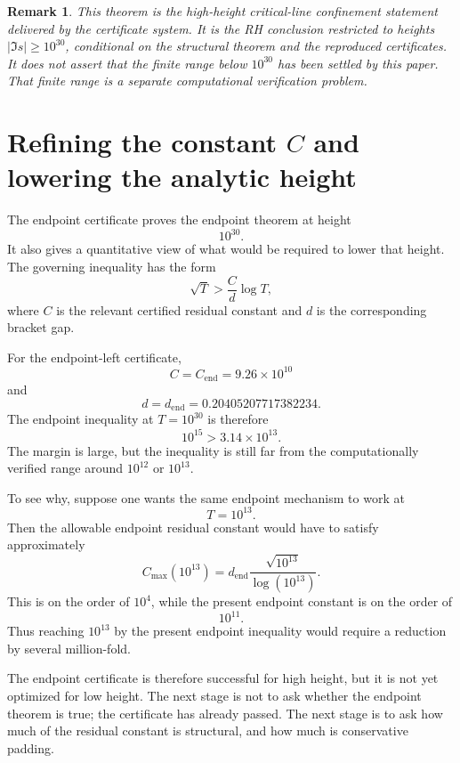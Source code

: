 \documentclass[11pt]{article}
\newtheorem{remark}[theorem]{Remark}
\newcommand{\Cend}{C_{\mathrm{end}}}
\newcommand{\dend}{d_{\mathrm{end}}}
\begin{document}
\begin{remark}
This theorem is the high-height critical-line confinement statement delivered
by the certificate system.  It is the RH conclusion restricted to heights
\(|\Im s|\ge10^{30}\), conditional on the structural theorem and the reproduced
certificates.  It does not assert that the finite range below \(10^{30}\) has been settled by this paper.  That finite range is a separate computational verification problem.
\end{remark}







\appendix

\section{Refining the constant \(C\) and lowering the analytic height}

The endpoint certificate proves the endpoint theorem at height
\[
10^{30}.
\]
It also gives a quantitative view of what would be required to lower that height.  The governing inequality has the form
\[
\sqrt{T}>
\frac{C}{d}\log T,
\]
where \(C\) is the relevant certified residual constant and \(d\) is the corresponding bracket gap.

For the endpoint-left certificate,
\[
C=\Cend
=
9.26\times10^{10}
\]
and
\[
d=\dend=0.20405207717382234.
\]
The endpoint inequality at \(T=10^{30}\) is therefore
\[
10^{15}
>
3.14\times10^{13}.
\]
The margin is large, but the inequality is still far from the computationally verified range around \(10^{12}\) or \(10^{13}\).

To see why, suppose one wants the same endpoint mechanism to work at
\[
T=10^{13}.
\]
Then the allowable endpoint residual constant would have to satisfy approximately
\[
C_{\max}(10^{13})
=
\dend\frac{\sqrt{10^{13}}}{\log(10^{13})}.
\]
This is on the order of \(10^4\), while the present endpoint constant is on the order of
\[
10^{11}.
\]
Thus reaching \(10^{13}\) by the present endpoint inequality would require a reduction by several million-fold.

The endpoint certificate is therefore successful for high height, but it is not yet optimized for low height.  The next stage is not to ask whether the endpoint theorem is true; the certificate has already passed.  The next stage is to ask how much of the residual constant is structural, and how much is conservative padding.
\end{document}
